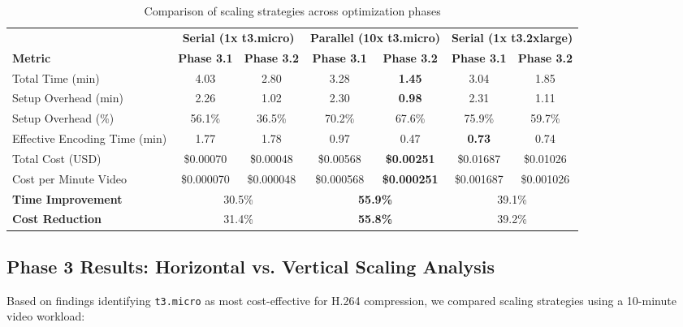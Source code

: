 \documentclass[conference]{IEEEtran}
\begin{document}
\begin{table}[!htpb]
	\centering
	\caption{Comparison of scaling strategies across optimization phases}
	\label{tab:unified_case_study}
	\begin{tabular*}{\textwidth}{l @{\extracolsep{\fill}} | cc | cc | cc}
		\toprule
		& \multicolumn{2}{c|}{\textbf{Serial (1x t3.micro)}} & \multicolumn{2}{c|}{\textbf{Parallel (10x t3.micro)}} & \multicolumn{2}{c}{\textbf{Serial (1x t3.2xlarge)}} \\
		\cmidrule(lr){2-3} \cmidrule(lr){4-5} \cmidrule(lr){6-7}
		\textbf{Metric} & \textbf{Phase 3.1} & \textbf{Phase 3.2} & \textbf{Phase 3.1} & \textbf{Phase 3.2} & \textbf{Phase 3.1} & \textbf{Phase 3.2} \\
		\midrule
		Total Time (min)          & 4.03  & 2.80  & 3.28 & \textbf{1.45} & 3.04 & 1.85 \\
		Setup Overhead (min)      & 2.26  & 1.02  & 2.30 & \textbf{0.98} & 2.31 & 1.11 \\
		Setup Overhead (\%)       & 56.1\% & 36.5\% & 70.2\% & 67.6\% & 75.9\% & 59.7\% \\
		Effective Encoding Time (min) & 1.77  & 1.78  & 0.97 & 0.47 & \textbf{0.73} & 0.74 \\
		\midrule
		Total Cost (USD)          & \$0.00070 & \$0.00048 & \$0.00568 & \textbf{\$0.00251} & \$0.01687 & \$0.01026 \\
		Cost per Minute Video     & \$0.000070 & \$0.000048 & \$0.000568 & \textbf{\$0.000251} & \$0.001687 & \$0.001026 \\
		\midrule \midrule
		\textbf{Time Improvement} & \multicolumn{2}{c|}{30.5\%} & \multicolumn{2}{c|}{\textbf{55.9\%}} & \multicolumn{2}{c}{39.1\%} \\
		\textbf{Cost Reduction}   & \multicolumn{2}{c|}{31.4\%} & \multicolumn{2}{c|}{\textbf{55.8\%}} & \multicolumn{2}{c}{39.2\%} \\
		\bottomrule
	\end{tabular*}
\end{table}
	
	\subsection{Phase 3 Results: Horizontal vs. Vertical Scaling Analysis}
	\label{results-phase3}
	
	Based on findings identifying \texttt{t3.micro} as most cost-effective for H.264 compression, we compared scaling strategies using a 10-minute video workload:
	
\end{document}
